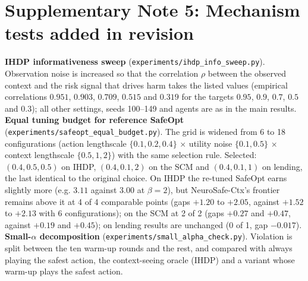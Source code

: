 \documentclass[11pt,a4paper]{article}
\begin{document}
\begin{table}[h]
\caption{\textbf{Theorem~1 on the Gaussian threshold instance ($\Delta=1$).} Entries
are $(R_n+2V_n)/n$, with the violation rate in parentheses. Bayes rule and always-safe: 8 seeds of
$n=2{,}000$; $\alpha$-constrained Bayes: $2\times10^5$ draws; learner: 8 seeds of $n=600$.
``Always safe'' plays $a_0$.}

\centering\small

\end{table}

\begin{table}[h]
\caption{\textbf{MIMIC-IV gate, evaluated in the validated simulator.} Columns: share of states with at
least two safe doses; share in which the MAP-maximising dose is unsafe; mean MAP lost when the
constraint binds; improvement of the best constrained policy over clinicians. Thresholds fixed in
advance: $\ge0.80$, $\ge0.10$ and $\ge0.5$\,mmHg.}

\centering\small
\resizebox{\linewidth}{!}{}
\end{table}

\section*{Supplementary Note 5: Mechanism tests added in revision}
\textbf{IHDP informativeness sweep} (\texttt{experiments/ihdp\_info\_sweep.py}). Observation noise is
increased so that the correlation $\rho$ between the observed context and the risk signal that drives
harm takes the listed values (empirical correlations $0.951$, $0.903$, $0.709$, $0.515$ and $0.319$ for
the targets $0.95$, $0.9$, $0.7$, $0.5$ and $0.3$); all other settings, seeds 100--149 and agents are as in
the main results. \textbf{Equal tuning budget for reference SafeOpt} (\texttt{experiments/safeopt\_equal\_budget.py}).
The grid is widened from 6 to 18 configurations (action lengthscale $\{0.1,0.2,0.4\}$ $\times$ utility
noise $\{0.1,0.5\}$ $\times$ context lengthscale $\{0.5,1,2\}$) with the same selection rule. Selected:
$(0.4,0.5,0.5)$ on IHDP, $(0.4,0.1,2)$ on the SCM and $(0.4,0.1,1)$ on lending, the last identical to the
original choice. On IHDP the re-tuned SafeOpt earns slightly more (e.g. $3.11$ against $3.00$ at
$\beta=2$), but NeuroSafe-Ctx's frontier remains above it at 4 of 4 comparable points (gaps $+1.20$ to
$+2.05$, against $+1.52$ to $+2.13$ with 6 configurations); on the SCM at 2 of 2 (gaps $+0.27$ and
$+0.47$, against $+0.19$ and $+0.45$); on lending results are unchanged (0 of 1, gap $-0.017$).
\textbf{Small-$\alpha$ decomposition} (\texttt{experiments/small\_alpha\_check.py}).
Violation is split between the ten warm-up rounds and the rest, and compared with always playing the safest
action, the context-seeing oracle (IHDP) and a variant whose warm-up plays the safest action.
\end{document}
